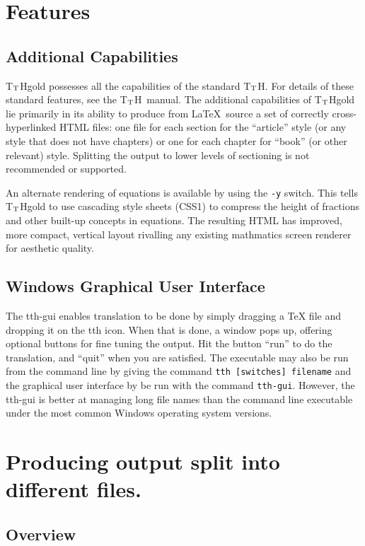 \documentclass[12pt]{article}
\def\href#1#2{#2}
\def\tth{T$_{\rm T}$H}
\begin{document}
\section{Features}

\subsection{Additional Capabilities}
\tth{}gold possesses all the capabilities of the standard \tth. For
details of these standard features, see the
\href{/tth/manual.cgi}{\tth\ manual}. The additional capabilities of
\tth{}gold lie primarily in its ability to produce from \LaTeX\ source
a set of correctly cross-hyperlinked HTML files: one file for each
section for the ``article'' style (or any style that does not have
chapters) or one for each chapter for ``book'' (or other relevant)
style. Splitting the output to lower levels of sectioning is not
recommended or supported.

An alternate rendering of equations is available by using the
\verb!-y! switch. This tells \tth{}gold to use cascading style sheets
(CSS1) to compress the height of fractions and other built-up concepts
in equations. The resulting HTML has improved, more compact, vertical
layout rivalling any existing mathmatics screen renderer for aesthetic
quality.

\subsection{Windows Graphical User Interface}
The tth-gui enables translation to be done by simply dragging a TeX
file and dropping it on the tth icon. When that is done, a window pops
up, offering optional buttons for fine tuning the output. Hit the
button ``run'' to do the translation, and ``quit'' when you are
satisfied.  The executable may also be run from the command line by
giving the command \verb!tth [switches] filename! and the graphical
user interface by be run with the command \verb!tth-gui!. However, the
tth-gui is better at managing long file names than the command line
executable under the most common Windows operating system versions.


\section{Producing output split into different files.}

\subsection{Overview}
\end{document}
